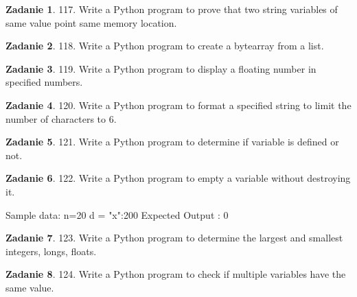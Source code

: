 \documentclass[11pt]{article}
\theoremstyle{definition}
\newtheorem{zadanie}{Zadanie}
\begin{document}
\begin{zadanie}


117. Write a Python program to prove that two string variables of same value point same memory location. 

\end{zadanie}

\begin{zadanie}


118. Write a Python program to create a bytearray from a list. 

\end{zadanie}

\begin{zadanie}


119. Write a Python program to display a floating number in specified numbers. 

\end{zadanie}

\begin{zadanie}


120. Write a Python program to format a specified string to limit the number of characters to 6. 

\end{zadanie}

\begin{zadanie}


121. Write a Python program to determine if variable is defined or not. 

\end{zadanie}

\begin{zadanie}


122. Write a Python program to empty a variable without destroying it. 

Sample data: n=20
d = {"x":200}
Expected Output : 0
{}


\end{zadanie}

\begin{zadanie}


123. Write a Python program to determine the largest and smallest integers, longs, floats. 

\end{zadanie}

\begin{zadanie}


124. Write a Python program to check if multiple variables have the same value. 

\end{zadanie}
\end{document}
